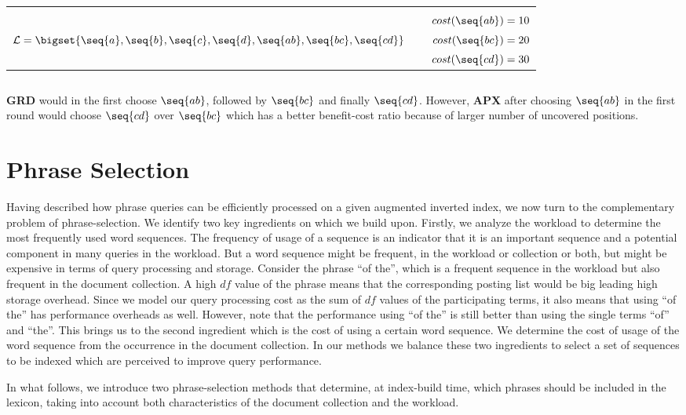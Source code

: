 \begin{tabular}{l|r}
   &\\
   &~~ $cost(\seq{ab}) = 10$ \\
  $\mathcal{L} = \bigset{\seq{a}, \seq{b}, \seq{c}, \seq{d}, \seq{ab}, \seq{bc}, \seq{cd}}$ &~~ $cost(\seq{bc}) = 20$\\
   &~~ $cost(\seq{cd}) = 30$\\
   \end{tabular}
$$
$$


\textbf{GRD} would in the first choose $\seq{ab}$, followed by $\seq{bc}$ and finally $\seq{cd}$. However, \textbf{APX} after choosing $\seq{ab}$ in the first round would choose $\seq{cd}$ over $\seq{bc}$ which has a better benefit-cost ratio because of larger number of uncovered positions.

\section{Phrase Selection}
\label{sec:phrase-selection}

Having described how phrase queries can be efficiently processed on a
given augmented inverted index, we now turn to the complementary
problem of phrase-selection. We identify two key ingredients on which we build upon. Firstly, we analyze the workload to determine the most frequently used word sequences. The frequency of usage of a sequence is an indicator that it is an important sequence and a potential component in many queries in the workload. But a word sequence might be frequent, in the workload or collection or both, but might be expensive in terms of query processing and storage. Consider the phrase ``of the'', which is a frequent sequence in the workload but also frequent in the document collection. A high $df$ value of the phrase means that the corresponding posting list would be big leading high storage overhead. Since we model our query processing cost as the sum of $df$ values of the participating terms, it also means that using ``of the'' has performance overheads as well. However, note that the performance using ``of the'' is still better than using the single terms ``of'' and ``the''. This brings us to the second ingredient which is the cost of using a certain word sequence. We determine the cost of usage of the word sequence from the occurrence in the document collection. In our methods we balance these two ingredients to select a set of sequences to be indexed which are perceived to improve query performance.

In what follows, we introduce two
phrase-selection methods that determine, at index-build time, which
phrases should be included in the lexicon, taking into account both
characteristics of the document collection and the workload.

